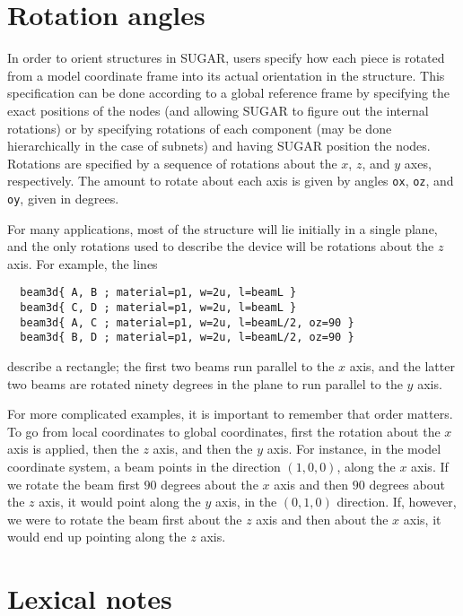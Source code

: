 \section{Rotation angles}

In order to orient structures in SUGAR, users specify how each piece is rotated
from a model coordinate frame into its actual orientation in the structure.
This specification can be done according to a global reference frame by specifying
the exact positions of the nodes (and allowing SUGAR to figure out the internal
rotations) or by specifying rotations of each component (may be done hierarchically 
in the case of subnets) and having SUGAR position the nodes.
Rotations are specified by a sequence of rotations about the $x$, $z$, and $y$
axes, respectively.  The amount to rotate about each axis is given by angles
\texttt{ox}, \texttt{oz}, and \texttt{oy}, given in degrees.


For many applications, most of the structure will lie initially
in a single plane, and the only rotations used to describe the device
will be rotations about the $z$ axis.  For example, the lines
\begin{verbatim}
  beam3d{ A, B ; material=p1, w=2u, l=beamL }
  beam3d{ C, D ; material=p1, w=2u, l=beamL }
  beam3d{ A, C ; material=p1, w=2u, l=beamL/2, oz=90 }
  beam3d{ B, D ; material=p1, w=2u, l=beamL/2, oz=90 }
\end{verbatim}
describe a rectangle; the first two beams run parallel to the $x$ axis,
and the latter two beams are rotated ninety degrees in the plane to run
parallel to the $y$ axis.

For more complicated examples, it is important to remember that order
matters.  To go from local coordinates to global coordinates, first the
rotation about the $x$ axis is applied, then the $z$ axis, and then the $y$
axis.  For instance, in the model coordinate system, a beam points in the
direction $(1,0,0)$, along the $x$ axis.  If we rotate the beam first $90$
degrees about the $x$ axis and then $90$ degrees about the $z$ axis, it would
point along the $y$ axis, in the $(0,1,0)$ direction.  If, however, we were to
rotate the beam first about the $z$ axis and then about the $x$ axis, it would
end up pointing along the $z$ axis.


\section{Lexical notes}

